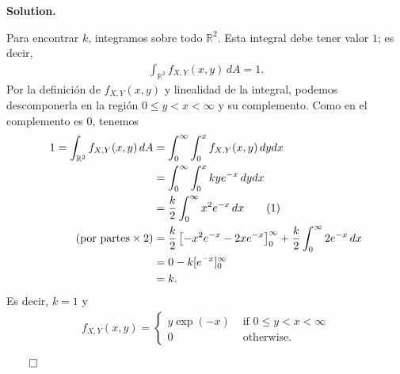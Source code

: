 \documentclass{article}
\newcommand\numberthis{\addtocounter{equation}{1}\tag{\theequation}}
\theoremstyle{problemstyle}
\newenvironment{solution}{%
  \begin{mdframed}[linewidth=0.8pt,linecolor=Gray,backgroundcolor=Gray!5,roundcorner=5pt]%
  \noindent\textbf{Solution.}%
}{%
\hfill $ \qed $ 
  \end{mdframed}%
}
\newcommand{\R}{\mathbb R}
\begin{document}
\begin{solution}
	Para encontrar $ k $, integramos sobre todo $ \R^2 $. Esta integral debe tener valor $ 1 $; es decir,
	\begin{align*}
		\displaystyle\int_{\R^2} f_{X,Y}(x,y)\,dA = 1.
	\end{align*}
	Por la definici\'on de $ f_{X,Y}(x,y) $ y linealidad de la integral, podemos descomponerla en la regi\'on $ 0\leq y < x<\infty $ y su complemento. Como en el complemento es 0, tenemos
	\begin{align*}
		1=\displaystyle\int_{\R^2} f_{X,Y}(x,y)\,dA & = \int_{0}^{\infty}\int_{0}^{x} f_{X,Y}(x,y)\,dydx                                                     \\
		                                            & = \int_{0}^{\infty}\int_{0}^{x} kye^{-x}\,dydx                                                         \\
                                                & = \frac{k}{2}\int_{0}^{\infty}x^2e^{-x}\,dx\numberthis\label{eq:x2e}                                                            \\
		(\text{por partes}\times 2)                 & = \frac{k}{2}\left[-x^2e^{-x} - 2xe^{-x}\right]_{0}^{\infty} + \frac{k}{2}\int_{0}^{\infty}2e^{-x}\,dx \\
		                                            & = 0 - k [e^{-x}]_{0}^{\infty}                                                                          \\
		                                            & = k.
	\end{align*}
	Es decir, $ k=1 $ y
	\begin{align*}
		f_{X,Y}(x,y) =
		\begin{cases}
			y\exp(-x) & \text{ if } 0\leq y<x<\infty \\
			0         & \text{ otherwise}.
		\end{cases}
	\end{align*}


\end{solution}
\end{document}
